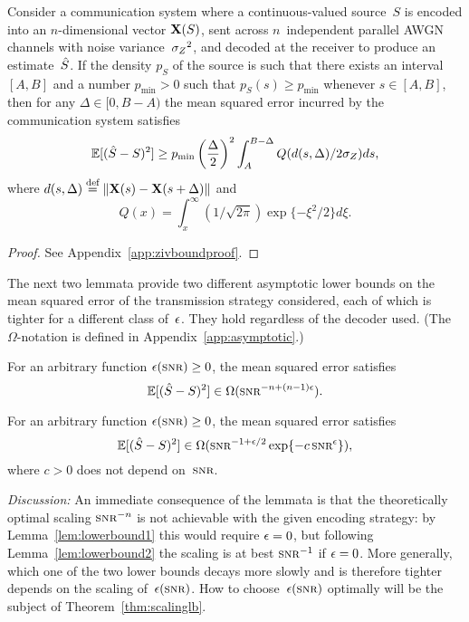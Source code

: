 \begin{lemma}
  \label{lem:zivbound}
  Consider a communication system where a con\-tin\-u\-ous-valued source~$S$ is
  encoded into an $n$-dimensional vector $\mathbf{X}(S)$, sent across $n$~independent
  parallel AWGN channels with noise variance~${{\sigma_Z}^2}$, and decoded at the receiver
  to produce an estimate~${\hat{S}}$.  If the density $p_S$ of the source is such that
  there exists an interval $[A,B]$ and a number $p_{\min} > 0$ such that $p_S(s)
  \ge p_{\min}$ whenever $s \in [A,B]$, then for any $\Delta \in [0,B-A)$ the
  mean squared error incurred by the communication system satisfies
  \begin{equation}
    \label{eq:zivbound}
    \mathbb{E}[({\hat{S}} - S)^2] \ge p_{\min} \left(\frac{\Delta}{2} \right)^2 
    \int_A^{B-\Delta} Q(d(s, \Delta) / 2 {\sigma_Z}) ds,
  \end{equation}
  where $d(s, \Delta) \stackrel{\text{def}}{=} \|\mathbf{X}(s) - \mathbf{X}(s+\Delta)\|$ and 
  \[Q(x) = \int_x^{\infty} (1/\sqrt{2\pi}) \exp\{-\xi^2/2\} d\xi.\]
\end{lemma}

\begin{proof}
  See Appendix~\ref{app:zivboundproof}.
\end{proof}

The next two lemmata provide two different asymptotic lower bounds on the
mean squared error of the transmission strategy considered, each of which is
tighter for a different class of~$\epsilon$. They hold regardless of the decoder used.
(The $\Omega$-notation is defined in Appendix~\ref{app:asymptotic}.)

\begin{lemma}
  \label{lem:lowerbound1}
  For an arbitrary function $\e(\snr) \ge 0$, the mean squared error satisfies
  \begin{equation*}
    \mse \in \Omega(\snr^{-n + (n-1)\e}).
  \end{equation*}
\end{lemma}

\begin{lemma}
  \label{lem:lowerbound2}
  For an arbitrary function $\e(\snr) \ge 0$, the mean squared error
  satisfies
  \begin{equation*}
    \mse \in \Omega(\snr^{-1+\e/2} \exp\{-c\snr^\e\}),
  \end{equation*}
  where $c>0$ does not depend on~$\snr$.
\end{lemma}

\emph{Discussion:} An immediate consequence of the lemmata is that the
theoretically optimal scaling $\snr^{-n}$ is not achievable with the given
encoding strategy: by Lemma~\ref{lem:lowerbound1} this would require $\epsilon = 0$,
but following Lemma~\ref{lem:lowerbound2} the scaling is at best $\snr^{-1}$ if
$\epsilon = 0 $.  More generally, which one of the two lower bounds decays more slowly
and is therefore tighter depends on the scaling of~$\e(\snr)$. How to
choose~$\e(\snr)$ optimally will be the subject of Theorem~\ref{thm:scalinglb}.

